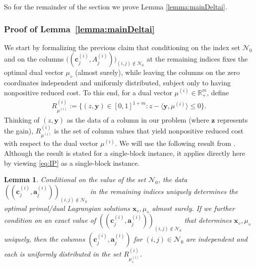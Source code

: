 \documentclass{article}
\newcommand{\red}[1]{{\color{red} #1}}
\newcommand{\R}{\mathbb{R}}
\newcommand{\ip}{\iprods}
\newcommand{\cN}{\mathcal{N}}
\newcommand{\av}[0]{\mathbf{a}}
\newcommand{\cv}[0]{\mathbf{c}}
\newcommand{\xv}[0]{\mathbf{x}}
\newcommand{\yv}[0]{\mathbf{y}}
\newcommand{\zv}[0]{\mathbf{z}}
\newcommand{\iprods}[2]{\langle {#1}, {#2} \rangle}
\newcommand{\colij}{\av^{(i)}_j}
\newtheorem{lemma}{Lemma}[section]
\newcommand{\nrc}{R}
\begin{document}
    So for the remainder of the section we prove Lemma \ref{lemma:mainDeltai}. 


\subsubsection{Proof of Lemma~\ref{lemma:mainDeltai}}

We start by formalizing the previous claim that conditioning on the index set
$\cN_0$ and on the columns $\big((\cv^{(i)}_j, A^{(i)}_j)\big)_{(i,j)\notin \cN_0}$
at the remaining indices fixes the optimal dual vector $\mu_{\diamond}$ (almost
surely), while leaving the columns on the zero coordinates independent and
uniformly distributed, subject only to having nonpositive reduced cost.
To this end, for a dual vector $\mu^{(i)} \in \R_+^m$, define
\begin{align*}
    \nrc^{(i)}_{\mu^{(i)}} :=
    \{ (z,\yv) \in [0,1]^{1+m} : z - \ip{\yv}{\mu^{(i)}} \le 0 \}.
\end{align*}
Thinking of $(z,\yv)$ as the data of a column in our problem (where $\zv$ represents
the gain), $\nrc^{(i)}_{\mu^{(i)}}$ is the set of column values that yield
nonpositive reduced cost with respect to the dual vector $\mu^{(i)}$.
We will use the following result from
\cite{dyer1989probabilistic,borst2023integrality}.
Although the result is stated for a single-block instance, it applies directly
here by viewing \eqref{eq:IP} as a single-block instance.

\begin{lemma}\cite{dyer1989probabilistic,borst2023integrality}
    \label{lem:cond_indp}
    Conditional on the value of the set $\mathcal{N}_0$, the data $((\cv^{(i)}_j, \colij))_{(i,j) \notin \cN_0}$ in the remaining indices uniquely determines the optimal primal/dual Lagrangian solutions $\xv_{\diamond},\mu_{\diamond}$ almost surely. If we further condition on an exact value of $((\cv^{(i)}_j, \colij))_{(i,j) \notin \cN_0}$ that determines $\xv_{\diamond},\mu_{\diamond}$ uniquely, then the columns $(\cv^{(i)}_j,\colij)$ for $(i,j) \in \cN_0$ are independent and each is uniformly distributed in the set $\nrc^{(i)}_{\mu^{(i)}_{\diamond}}$.
\end{lemma}
\end{document}
